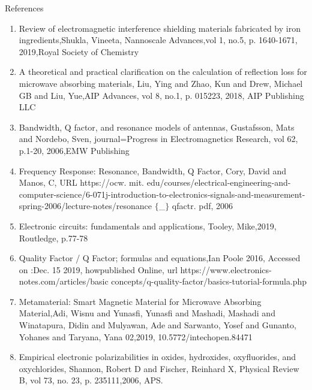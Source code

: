 \documentclass[11pt,aspect ratio=169]{beamer}
\begin{document}

\begin{frame}[allowframebreaks]{References}
	\begin{enumerate}
	
\item
	Review of electromagnetic interference shielding materials fabricated by iron ingredients,Shukla, Vineeta,
	Nannoscale Advances,vol 1,
	no.5,
	p. 1640-1671,
	2019,Royal Society of Chemistry


\item
	A theoretical and practical clarification on the calculation of reflection loss for microwave absorbing materials,
	Liu, Ying and Zhao, Kun and Drew, Michael GB and Liu, Yue,AIP Advances,
	vol 8,
	no.1,
	p. 015223, 2018, AIP Publishing LLC


\item
	Bandwidth, Q factor, and resonance models of antennas,
	Gustafsson, Mats and Nordebo, Sven,
	journal={Progress in Electromagnetics Research},
	vol 62,
	p.1-20, 2006,EMW Publishing

\item
	Frequency Response: Resonance, Bandwidth, Q Factor,
	Cory, David and Manos, C, URL https://ocw. mit. edu/courses/electrical-engineering-and-computer-science/6-071j-introduction-to-electronics-signals-and-measurement-spring-2006/lecture-notes/resonance $\{$\_$\}$ qfactr. pdf, 2006

\item
	Electronic circuits: fundamentals and applications,
	Tooley, Mike,2019, Routledge,
	p.77-78

\item
	Quality Factor / Q Factor; formulas and equations,Ian Poole
	2016,
	Accessed on :Dec. 15 2019,
	howpublished Online,
	url https://www.electronics-notes.com/articles/basic concepts/q-quality-factor/basics-tutorial-formula.php

\item
	Metamaterial: Smart Magnetic Material for Microwave Absorbing Material,Adi, Wisnu and Yunasfi, Yunasfi and Mashadi, Mashadi and Winatapura, Didin and Mulyawan, Ade and Sarwanto, Yosef and Gunanto, Yohanes and Taryana, Yana
     02,2019,
	10.5772/intechopen.84471

\item 
Empirical electronic polarizabilities in oxides, hydroxides, oxyfluorides, and oxychlorides,
Shannon, Robert D and Fischer, Reinhard X,
Physical Review B,	vol 73,	no. 23,	p. 235111,2006,	APS.


\end{enumerate}
\end{frame}
\end{document}
